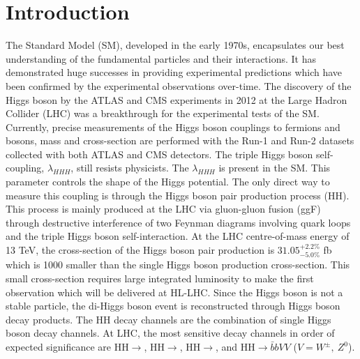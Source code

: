 \newpage
\chapter*{Introduction}
\label{Intro}
The Standard Model (SM), developed in the early 1970s, encapsulates our best understanding of the fundamental particles and their interactions. It has demonstrated huge successes in providing experimental predictions which have been confirmed by the experimental observations over-time. The discovery of the Higgs boson by the ATLAS and CMS experiments in 2012 at the Large Hadron Collider (LHC) was a breakthrough for the experimental tests of the SM. Currently, precise measurements of the Higgs boson couplings to fermions and bosons, mass and cross-section are performed with the Run-1 and Run-2 datasets collected with both ATLAS and CMS detectors. The triple Higgs boson self-coupling, $\lambda_{HHH}$, still resists physicists. The $\lambda_{HHH}$ is present in the SM. This parameter controls the shape of the Higgs potential. The only direct way to measure this coupling is through the Higgs boson pair production process (HH). This process is mainly produced at the LHC via gluon-gluon fusion (ggF) through destructive interference of two Feynman diagrams involving quark loops and the triple Higgs boson self-interaction. At the LHC centre-of-mass energy of 13 TeV, the cross-section of the Higgs boson pair production is $31.05_{-5.0\%}^{+2.2\%}$ fb which is 1000 smaller than the single Higgs boson production cross-section. This small cross-section requires large integrated luminosity to make the first observation which will be delivered at HL-LHC. Since the Higgs boson is not a stable particle, the di-Higgs boson event is reconstructed through Higgs boson decay products. The HH decay channels are the combination of single Higgs boson decay channels. At LHC, the most sensitive decay channels in order of expected significance are HH$\to$\bbtt, HH$\to$\bbyy,  HH$\to$\bbbb, and HH$\to\bar{b}bVV$ ($V=W^{\pm},\ Z^0$). \\

